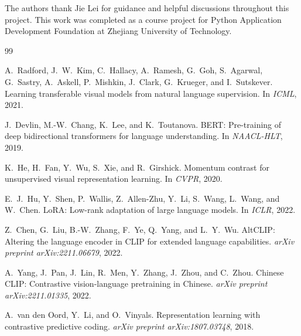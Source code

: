 \documentclass[10pt,leqno]{amsart}
\begin{document}
The authors thank Jie Lei for guidance and helpful discussions throughout this project. This work was completed as a course project for Python Application Development Foundation at Zhejiang University of Technology.

\bigskip


\begin{thebibliography}{99}

A.~Radford, J.~W.~Kim, C.~Hallacy, A.~Ramesh, G.~Goh, S.~Agarwal, G.~Sastry, A.~Askell, P.~Mishkin, J.~Clark, G.~Krueger, and I.~Sutskever.
\newblock Learning transferable visual models from natural language supervision.
\newblock In \textit{ICML}, 2021.

J.~Devlin, M.-W.~Chang, K.~Lee, and K.~Toutanova.
\newblock BERT: Pre-training of deep bidirectional transformers for language understanding.
\newblock In \textit{NAACL-HLT}, 2019.

K.~He, H.~Fan, Y.~Wu, S.~Xie, and R.~Girshick.
\newblock Momentum contrast for unsupervised visual representation learning.
\newblock In \textit{CVPR}, 2020.

E.~J.~Hu, Y.~Shen, P.~Wallis, Z.~Allen-Zhu, Y.~Li, S.~Wang, L.~Wang, and W.~Chen.
\newblock LoRA: Low-rank adaptation of large language models.
\newblock In \textit{ICLR}, 2022.

Z.~Chen, G.~Liu, B.-W.~Zhang, F.~Ye, Q.~Yang, and L.~Y.~Wu.
\newblock AltCLIP: Altering the language encoder in CLIP for extended language capabilities.
\newblock \textit{arXiv preprint arXiv:2211.06679}, 2022.

A.~Yang, J.~Pan, J.~Lin, R.~Men, Y.~Zhang, J.~Zhou, and C.~Zhou.
\newblock Chinese CLIP: Contrastive vision-language pretraining in Chinese.
\newblock \textit{arXiv preprint arXiv:2211.01335}, 2022.

A.~van den Oord, Y.~Li, and O.~Vinyals.
\newblock Representation learning with contrastive predictive coding.
\newblock \textit{arXiv preprint arXiv:1807.03748}, 2018.


\end{thebibliography}
\end{document}
